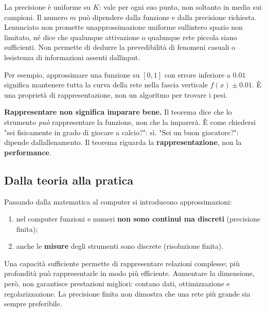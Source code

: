 \documentclass[11pt,a4paper,oneside,openany]{book}
\providecommand{\tightlist}{\setlength{\itemsep}{0pt}\setlength{\parskip}{0pt}}
\begin{document}
La precisione è uniforme su \(K\): vale per ogni suo punto, non soltanto in media sui campioni. Il numero \(m\) può dipendere dalla funzione e dalla precisione richiesta. L\textquotesingle enunciato non promette un\textquotesingle approssimazione uniforme sull\textquotesingle intero spazio non limitato, né dice che qualunque attivazione o qualunque rete piccola siano sufficienti. Non permette di dedurre la prevedibilità di fenomeni casuali o l\textquotesingle esistenza di informazioni assenti dall\textquotesingle input.

Per esempio, approssimare una funzione su \([0,1]\) con errore inferiore a \(0.01\) significa mantenere tutta la curva della rete nella fascia verticale \(f(x)\pm0.01\). È una proprietà di rappresentazione, non un algoritmo per trovare i pesi.

\textbf{Rappresentare non significa imparare bene.} Il teorema dice che lo strumento \emph{può} rappresentare la funzione, non che la imparerà. È come chiedersi "sei fisicamente in grado di giocare a calcio?": sì. "Sei un buon giocatore?": dipende dall\textquotesingle allenamento. Il teorema riguarda la \textbf{rappresentazione}, non la \textbf{performance}.

\subsection{Dalla teoria alla pratica}\label{f01-r506}

Passando dalla matematica al computer si introducono approssimazioni:

\begin{enumerate}
\def\labelenumi{\arabic{enumi}.}
\tightlist
\item
  nel computer funzioni e numeri \textbf{non sono continui ma discreti} (precisione finita);
\item
  anche le \textbf{misure} degli strumenti sono discrete (risoluzione finita).
\end{enumerate}

Una capacità sufficiente permette di rappresentare relazioni complesse; più profondità può rappresentarle in modo più efficiente. Aumentare la dimensione, però, non garantisce prestazioni migliori: contano dati, ottimizzazione e regolarizzazione. La precisione finita non dimostra che una rete più grande sia sempre preferibile.
\end{document}
